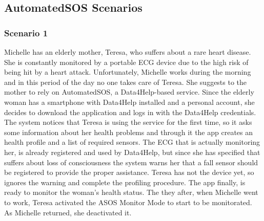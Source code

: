 {\color{Blue}\subsection{AutomatedSOS Scenarios}}
{\color{Blue}\subsubsection{Scenario 1}}
Michelle has an elderly mother, Teresa, who suffers about a rare heart disease. She is constantly monitored by a portable ECG device due to the high risk of being hit by a heart attack. Unfortunately, Michelle works during the morning and in this period of the day no one takes care of Teresa. She suggests to the mother to rely on AutomatedSOS, a Data4Help-based service. Since the elderly woman has a smartphone with Data4Help installed and a personal account, she decides to download the application and logs in with the Data4Help credentials. The system notices that Teresa is using the service for the first time, so it asks some information about her health problems and through it the app creates an health profile and a list of required sensors. The ECG that is actually monitoring her, is already registered and used by Data4Help, but since she has specified that suffers about loss of consciousness the system warns her that a fall sensor should be registered to provide the proper assistance. Teresa has not the device yet, so ignores the warning and complete the profiling procedure. The app finally, is ready to monitor the woman’s health status. The they after, when Michelle went to work, Teresa activated the ASOS Monitor Mode to start to be monitorated. As Michelle returned, she deactivated it.

